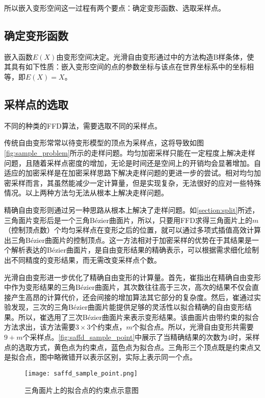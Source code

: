 所以嵌入变形空间这一过程有两个要点：确定变形函数、选取采样点。

\subsection{确定变形函数}
嵌入函数$E(X)$由变形空间决定。光滑自由变形通过\cite{Feng02}中的方法构造B样条体，使其具有如下性质：嵌入变形空间的点的参数坐标与该点在世界坐标系中的坐标相等，即$E(X)=X$。

\subsection{采样点的选取}
不同的种类的FFD算法，需要选取不同的采样点。

传统自由变形常常以待变形模型的顶点为采样点，这将导致如图\autoref{fig:sample_problem}所示的走样问题。均匀加密采样只能在一定程度上解决走样问题，且随着采样点密度的增加，无论是时间还是空间上的开销均会显著增加。自适应的加密采样\cite{parry1986, gain1999, griessmair1989deformation}是在加密采样思路下解决走样问题的更进一步的尝试。相对均匀加密采样而言，其虽然能减少一定计算量，但是实现复杂，无法很好的应对一些特殊情况。以上两种方法匀无法从根本上解决走样问题。

精确自由变形\cite{Feng00}则通过另一种思路从根本上解决了走样问题。如\ref{section:split}所述，三角面片变形后是一个三角Bézier曲面片，所以，只要用FFD求得三角面片上的$m$（控制顶点数）个均匀采样点在变形之后的位置，就可以通过多项式插值高效计算出三角Bézier曲面片的控制顶点。这一方法相对于加密采样的优势在于其结果是一个解析表达的Bézier曲面片，是自由变形结果的精确表示，可以根据需求细化绘制出不同精度的变形结果，而无需改变采样点个数。

光滑自由变形\cite{Cui15}进一步优化了精确自由变形的计算量。首先，崔指出在精确自由变形中作为变形结果的三角Bézier曲面片，其次数往往高于三次，高次的结果不仅会直接产生高昂的计算代价，还会间接的增加算法其它部分的复杂度。然后，崔通过实验发现，三次的三角Bézier曲面片能提供足够的灵活性以拟合精确的自由变形结果。所以，崔选用了三次Bézier曲面片来表示变形结果。该曲面片由带约束的拟合方法求出，该方法需要$3\times3$个约束点，$m$个拟合点。所以，光滑自由变形共需要$9+m$个采样点。\autoref{fig:saffd_sample_point}中展示了当精确结果的次数为4时，采样点的选取方式，黄色点为约束点，蓝色点为拟合点。三角形三个顶点既是约束点又是拟合点，图中略微错开以表示区别，实际上表示同一个点。

\begin{figure}[htbp]
	\centering
	\texttt{[image: saffd\_sample\_point.png]}
    \caption{三角面片上的拟合点的约束点示意图}\label{fig:saffd_sample_point}
\end{figure}


